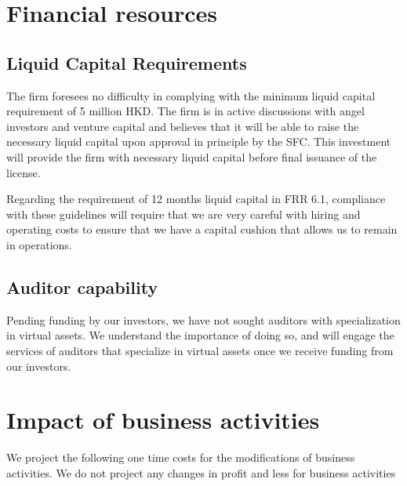 \section{Financial resources}
\subsection{Liquid Capital Requirements}

The firm foresees no difficulty in complying with the minimum liquid
capital requirement of 5 million HKD.  The firm is in active
discussions with angel investors and venture capital and believes that
it will be able to raise the necessary liquid capital upon approval in
principle by the SFC. This investment will provide the firm with
necessary liquid capital before final issuance of the license.

Regarding the requirement of 12 months liquid capital in FRR
6.1, compliance with these guidelines will require that we are very
careful with hiring and operating costs to ensure that we
have a capital cushion that allows us to remain in operations.


\subsection{Auditor capability}
Pending funding by our investors, we have not sought auditors with
specialization in virtual assets.  We understand the importance of
doing so, and will engage the services of auditors that specialize in
virtual assets once we receive funding from our investors.

\section{Impact of business activities}

We project the following one time costs for the modifications of
business activities.  We do not project any changes in profit and less
for business activities

